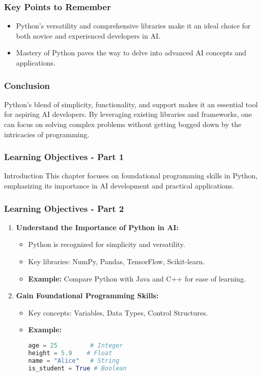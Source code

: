 \documentclass[aspectratio=169]{beamer}
\begin{document}
\begin{frame}[fragile]
    \frametitle{Key Points to Remember}
    \begin{itemize}
        \item Python's versatility and comprehensive libraries make it an ideal choice for both novice and experienced developers in AI.
        \item Mastery of Python paves the way to delve into advanced AI concepts and applications.
    \end{itemize}
\end{frame}

\begin{frame}[fragile]
    \frametitle{Conclusion}
    Python’s blend of simplicity, functionality, and support makes it an essential tool for aspiring AI developers. By leveraging existing libraries and frameworks, one can focus on solving complex problems without getting bogged down by the intricacies of programming.
\end{frame}

\begin{frame}[fragile]
    \frametitle{Learning Objectives - Part 1}
    \begin{block}{Introduction}
        This chapter focuses on foundational programming skills in Python, emphasizing its importance in AI development and practical applications.
    \end{block}
\end{frame}

\begin{frame}[fragile]
    \frametitle{Learning Objectives - Part 2}
    \begin{enumerate}
        \item \textbf{Understand the Importance of Python in AI:}
        \begin{itemize}
            \item Python is recognized for simplicity and versatility.
            \item Key libraries: NumPy, Pandas, TensorFlow, Scikit-learn.
            \item \textbf{Example:} Compare Python with Java and C++ for ease of learning.
        \end{itemize}
        
        \item \textbf{Gain Foundational Programming Skills:}
        \begin{itemize}
            \item Key concepts: Variables, Data Types, Control Structures.
            \item \textbf{Example:}
            \begin{lstlisting}[language=Python]
age = 25         # Integer
height = 5.9    # Float
name = "Alice"   # String
is_student = True # Boolean
            \end{lstlisting}
        \end{itemize}
    \end{enumerate}
\end{frame}
\end{document}
